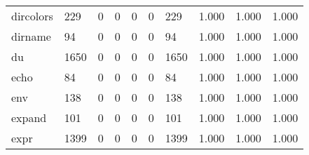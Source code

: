 \begin{longtable}{lp{1.3cm}p{1.3cm}p{1.3cm}p{1.3cm}p{1.3cm}p{1.3cm}p{1.3cm}p{1.3cm}p{1.3cm}}
dircolors &                    229 &                                  0 &                                 0 &                                0 &                                 0 &                             229 &                                1.000 &                                  1.000 &                                1.000 \\
dirname   &                     94 &                                  0 &                                 0 &                                0 &                                 0 &                              94 &                                1.000 &                                  1.000 &                                1.000 \\
du        &                   1650 &                                  0 &                                 0 &                                0 &                                 0 &                            1650 &                                1.000 &                                  1.000 &                                1.000 \\
echo      &                     84 &                                  0 &                                 0 &                                0 &                                 0 &                              84 &                                1.000 &                                  1.000 &                                1.000 \\
env       &                    138 &                                  0 &                                 0 &                                0 &                                 0 &                             138 &                                1.000 &                                  1.000 &                                1.000 \\
expand    &                    101 &                                  0 &                                 0 &                                0 &                                 0 &                             101 &                                1.000 &                                  1.000 &                                1.000 \\
expr      &                   1399 &                                  0 &                                 0 &                                0 &                                 0 &                            1399 &                                1.000 &                                  1.000 &                                1.000 \\

\end{longtable}
